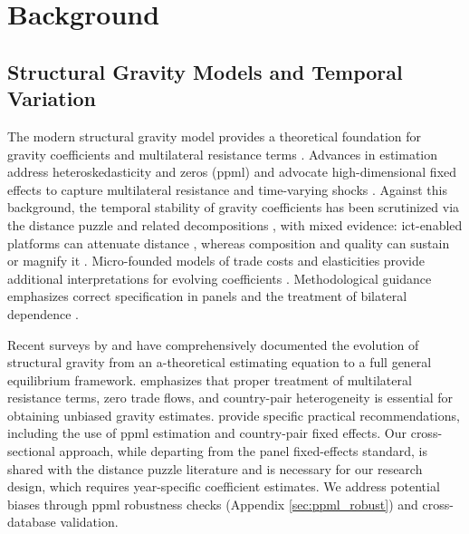 \documentclass[preprint, 3p,
authoryear]{elsarticle} %
\begin{document}
\section{Background}\label{background}

\subsection{Structural Gravity Models and Temporal
Variation}\label{subsec:gravity}

The modern structural gravity model provides a theoretical foundation
for gravity coefficients and multilateral resistance terms
\citep{anderson1979, anderson2003, anderson2011, headmayer2014, fally2015}.
Advances in estimation address heteroskedasticity and zeros (\gls{ppml})
and advocate high-dimensional fixed effects to capture multilateral
resistance and time-varying shocks
\citep{SantosSilvaTenreyro2006, helpman2008, santos2011, headmayer2014, fally2015}.
Against this background, the temporal stability of gravity coefficients
has been scrutinized via the distance puzzle and related decompositions
\citep{brun2005, disdier2008, berthelon2008, andersonyotov2010, yotov2012, novy2013},
with mixed evidence: \gls{ict}-enabled platforms can attenuate distance
\citep{lendle2016}, whereas composition and quality can sustain or
magnify it \citep{berthelon2008, hummels2005, baldwinharrigan2011}.
Micro-founded models of trade costs and elasticities provide additional
interpretations for evolving coefficients
\citep{eaton2002, simonovska2014, egger2015}. Methodological guidance
emphasizes correct specification in panels and the treatment of
bilateral dependence
\citep{egger2003, baldwin2006, headmayer2014, pesaran2006, chudik2015}.

Recent surveys by \citet{yotov2024evolution} and
\citet{larch2025estimating} have comprehensively documented the
evolution of structural gravity from an a-theoretical estimating
equation to a full general equilibrium framework.
\citet{yotov2024evolution} emphasizes that proper treatment of
multilateral resistance terms, zero trade flows, and country-pair
heterogeneity is essential for obtaining unbiased gravity estimates.
\citet{larch2025estimating} provide specific practical recommendations,
including the use of \gls{ppml} estimation
\citep{SantosSilvaTenreyro2006} and country-pair fixed effects. Our
cross-sectional approach, while departing from the panel fixed-effects
standard, is shared with the distance puzzle literature
\citep{disdier2008, yotov2012distance} and is necessary for our research
design, which requires year-specific coefficient estimates. We address
potential biases through \gls{ppml} robustness checks (Appendix
\ref{sec:ppml_robust}) and cross-database validation.
\end{document}
